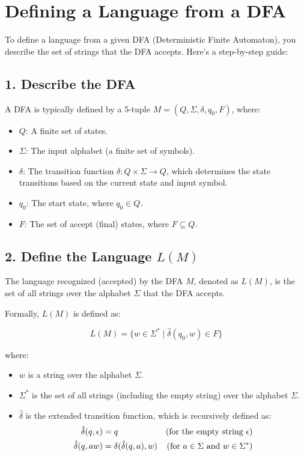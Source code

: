 \documentclass[12pt]{article}
\begin{document}
\section*{Defining a Language from a DFA}

To define a language from a given DFA (Deterministic Finite Automaton), you describe the set of strings that the DFA accepts. Here's a step-by-step guide:

\subsection*{1. Describe the DFA}
A DFA is typically defined by a 5-tuple \( M = (Q, \Sigma, \delta, q_0, F) \), where:

\begin{itemize}
    \item \( Q \): A finite set of states.
    \item \( \Sigma \): The input alphabet (a finite set of symbols).
    \item \( \delta \): The transition function \( \delta: Q \times \Sigma \rightarrow Q \), which determines the state transitions based on the current state and input symbol.
    \item \( q_0 \): The start state, where \( q_0 \in Q \).
    \item \( F \): The set of accept (final) states, where \( F \subseteq Q \).
\end{itemize}

\subsection*{2. Define the Language \( L(M) \)}
The language recognized (accepted) by the DFA \( M \), denoted as \( L(M) \), is the set of all strings over the alphabet \( \Sigma \) that the DFA accepts.

Formally, \( L(M) \) is defined as:

\[
L(M) = \{ w \in \Sigma^* \mid \hat{\delta}(q_0, w) \in F \}
\]

where:

\begin{itemize}
    \item \( w \) is a string over the alphabet \( \Sigma \).
    \item \( \Sigma^* \) is the set of all strings (including the empty string) over the alphabet \( \Sigma \).
    \item \( \hat{\delta} \) is the extended transition function, which is recursively defined as:
    \begin{align*}
    \hat{\delta}(q, \epsilon) &= q &\text{(for the empty string \( \epsilon \))} \\
    \hat{\delta}(q, aw) &= \delta(\hat{\delta}(q, a), w) &\text{(for \( a \in \Sigma \) and \( w \in \Sigma^* \))}
    \end{align*}
\end{itemize}
\end{document}
